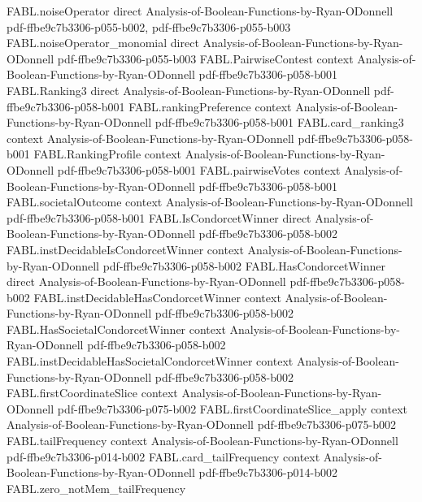 \begin{theorem}
\proofstep
  {FABL.noiseOperator}
  {direct}
  {Analysis-of-Boolean-Functions-by-Ryan-ODonnell}
  {pdf-ffbe9c7b3306-p055-b002,
    pdf-ffbe9c7b3306-p055-b003}
\proofstep
  {FABL.noiseOperator_monomial}
  {direct}
  {Analysis-of-Boolean-Functions-by-Ryan-ODonnell}
  {pdf-ffbe9c7b3306-p055-b003}
\proofstep
  {FABL.PairwiseContest}
  {context}
  {Analysis-of-Boolean-Functions-by-Ryan-ODonnell}
  {pdf-ffbe9c7b3306-p058-b001}
\proofstep
  {FABL.Ranking3}
  {direct}
  {Analysis-of-Boolean-Functions-by-Ryan-ODonnell}
  {pdf-ffbe9c7b3306-p058-b001}
\proofstep
  {FABL.rankingPreference}
  {context}
  {Analysis-of-Boolean-Functions-by-Ryan-ODonnell}
  {pdf-ffbe9c7b3306-p058-b001}
\proofstep
  {FABL.card_ranking3}
  {context}
  {Analysis-of-Boolean-Functions-by-Ryan-ODonnell}
  {pdf-ffbe9c7b3306-p058-b001}
\proofstep
  {FABL.RankingProfile}
  {context}
  {Analysis-of-Boolean-Functions-by-Ryan-ODonnell}
  {pdf-ffbe9c7b3306-p058-b001}
\proofstep
  {FABL.pairwiseVotes}
  {context}
  {Analysis-of-Boolean-Functions-by-Ryan-ODonnell}
  {pdf-ffbe9c7b3306-p058-b001}
\proofstep
  {FABL.societalOutcome}
  {context}
  {Analysis-of-Boolean-Functions-by-Ryan-ODonnell}
  {pdf-ffbe9c7b3306-p058-b001}
\proofstep
  {FABL.IsCondorcetWinner}
  {direct}
  {Analysis-of-Boolean-Functions-by-Ryan-ODonnell}
  {pdf-ffbe9c7b3306-p058-b002}
\proofstep
  {FABL.instDecidableIsCondorcetWinner}
  {context}
  {Analysis-of-Boolean-Functions-by-Ryan-ODonnell}
  {pdf-ffbe9c7b3306-p058-b002}
\proofstep
  {FABL.HasCondorcetWinner}
  {direct}
  {Analysis-of-Boolean-Functions-by-Ryan-ODonnell}
  {pdf-ffbe9c7b3306-p058-b002}
\proofstep
  {FABL.instDecidableHasCondorcetWinner}
  {context}
  {Analysis-of-Boolean-Functions-by-Ryan-ODonnell}
  {pdf-ffbe9c7b3306-p058-b002}
\proofstep
  {FABL.HasSocietalCondorcetWinner}
  {context}
  {Analysis-of-Boolean-Functions-by-Ryan-ODonnell}
  {pdf-ffbe9c7b3306-p058-b002}
\proofstep
  {FABL.instDecidableHasSocietalCondorcetWinner}
  {context}
  {Analysis-of-Boolean-Functions-by-Ryan-ODonnell}
  {pdf-ffbe9c7b3306-p058-b002}
\proofstep
  {FABL.firstCoordinateSlice}
  {context}
  {Analysis-of-Boolean-Functions-by-Ryan-ODonnell}
  {pdf-ffbe9c7b3306-p075-b002}
\proofstep
  {FABL.firstCoordinateSlice_apply}
  {context}
  {Analysis-of-Boolean-Functions-by-Ryan-ODonnell}
  {pdf-ffbe9c7b3306-p075-b002}
\proofstep
  {FABL.tailFrequency}
  {context}
  {Analysis-of-Boolean-Functions-by-Ryan-ODonnell}
  {pdf-ffbe9c7b3306-p014-b002}
\proofstep
  {FABL.card_tailFrequency}
  {context}
  {Analysis-of-Boolean-Functions-by-Ryan-ODonnell}
  {pdf-ffbe9c7b3306-p014-b002}
\proofstep
  {FABL.zero_notMem_tailFrequency}

\end{theorem}
